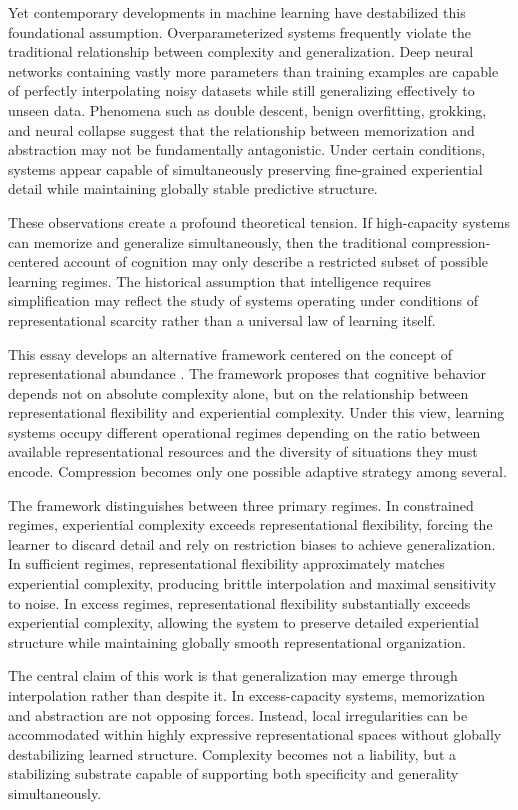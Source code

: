 \documentclass[12pt,a4paper]{article}
\begin{document}
Yet contemporary developments in machine learning have destabilized this foundational assumption. Overparameterized systems frequently violate the traditional relationship between complexity and generalization. Deep neural networks containing vastly more parameters than training examples are capable of perfectly interpolating noisy datasets while still generalizing effectively to unseen data. Phenomena such as double descent, benign overfitting, grokking, and neural collapse suggest that the relationship between memorization and abstraction may not be fundamentally antagonistic. Under certain conditions, systems appear capable of simultaneously preserving fine-grained experiential detail while maintaining globally stable predictive structure.

These observations create a profound theoretical tension. If high-capacity systems can memorize and generalize simultaneously, then the traditional compression-centered account of cognition may only describe a restricted subset of possible learning regimes. The historical assumption that intelligence requires simplification may reflect the study of systems operating under conditions of representational scarcity rather than a universal law of learning itself.

This essay develops an alternative framework centered on the concept of representational abundance \cite{DubovaSloman2026}. The framework proposes that cognitive behavior depends not on absolute complexity alone, but on the relationship between representational flexibility and experiential complexity. Under this view, learning systems occupy different operational regimes depending on the ratio between available representational resources and the diversity of situations they must encode. Compression becomes only one possible adaptive strategy among several.

The framework distinguishes between three primary regimes. In constrained regimes, experiential complexity exceeds representational flexibility, forcing the learner to discard detail and rely on restriction biases to achieve generalization. In sufficient regimes, representational flexibility approximately matches experiential complexity, producing brittle interpolation and maximal sensitivity to noise. In excess regimes, representational flexibility substantially exceeds experiential complexity, allowing the system to preserve detailed experiential structure while maintaining globally smooth representational organization.

The central claim of this work is that generalization may emerge through interpolation rather than despite it. In excess-capacity systems, memorization and abstraction are not opposing forces. Instead, local irregularities can be accommodated within highly expressive representational spaces without globally destabilizing learned structure. Complexity becomes not a liability, but a stabilizing substrate capable of supporting both specificity and generality simultaneously.
\end{document}
